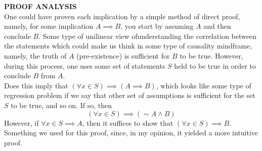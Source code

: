 \documentclass[12pt]{article}
\newenvironment{problem}[2][Problem]{\begin{trivlist}
		\item[\hskip \labelsep {\bfseries #1}\hskip \labelsep {\bfseries #2.}]}{\end{trivlist}}
\begin{document}
\begin{problem}{1.7}
	\textbf{PROOF ANALYSIS}\\
	
	One could have proven each implication by a simple method of direct proof, namely, for some implication $A \implies B$, you start by assuming $A$ and then conclude $B$. Some type of unilinear view ofunderstanding the correlation between the statements which could make us think in some type of causality mindframe, namely, the truth of $A$ (pre-existence) is sufficient for $B$ to be true. However, during this process, one uses some set of statements $S$ held to be true in order to conclude $B$ from $A$.\\
	
	Does this imply that $\left(\forall x\in S\right)\implies \left(A\implies B\right)$, which looks like some type of regression problem if we say that other set of assumptions is sufficient for the set $S$ to be true, and so on. If so, then
	\begin{equation*}
		\left(\forall x\in S\right)\implies \left(\sim A\wedge B\right)
	\end{equation*}
However, if $\forall x\in S \implies A$, then it suffices to show that $\left(\forall x\in S\right)\implies B$. Something we used for this proof, since, in my opinion, it yielded a more intuitive proof.
\end{problem}
\end{document}
